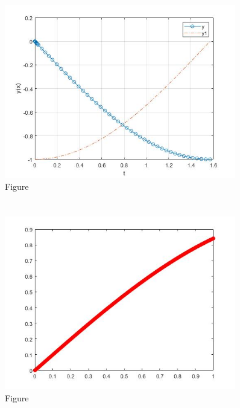 \documentclass{article}
\begin{document}
        \subsection{}
            
            \begin{figure}[H] 
                \centering 
                \includegraphics[width=0.9\textwidth]{img/Assignement_7_2.jpg}
                \caption{Figure} 
            \end{figure}
    \section{}
        \subsection{}
            
            \begin{figure}[H] 
                \centering 
                \includegraphics[width=0.9\textwidth]{img/Assignement_7_3.jpg}
                \caption{Figure} 
            \end{figure}
\end{document}
